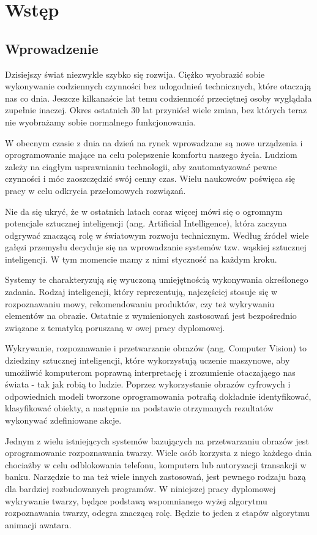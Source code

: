 \chapter{Wstęp}
\label{cha:wstep}

\section{Wprowadzenie}
Dzisiejszy świat niezwykle szybko się rozwija. Ciężko wyobrazić sobie wykonywanie codziennych czynności bez udogodnień technicznych, które otaczają nas co dnia. Jeszcze kilkanaście lat temu codzienność przeciętnej 
osoby wyglądała zupełnie inaczej. Okres ostatnich 30 lat przyniósł wiele zmian, bez których teraz nie wyobrażamy sobie normalnego funkcjonowania.

W obecnym czasie z dnia na dzień na rynek wprowadzane są nowe urządzenia i oprogramowanie mające na celu polepszenie komfortu naszego życia. Ludziom zależy na ciągłym usprawnianiu technologii, aby zautomatyzować pewne czynności i móc zaoszczędzić swój cenny czas. Wielu naukowców poświęca się pracy w celu odkrycia przełomowych rozwiązań.

Nie da się ukryć, że w ostatnich latach coraz więcej mówi się o ogromnym potencjale sztucznej inteligencji (ang. Artificial Intelligence), która zaczyna odgrywać znaczącą rolę w światowym rozwoju technicznym. Według źródeł wiele gałęzi przemysłu decyduje się na wprowadzanie systemów tzw. wąskiej sztucznej inteligencji. W tym momencie mamy z nimi styczność na każdym kroku.\cite{ai}   

Systemy te charakteryzują się wyuczoną umiejętnością wykonywania określonego zadania. Rodzaj inteligencji, który reprezentują, najczęściej stosuje się w rozpoznawaniu mowy, rekomendowaniu produktów, czy też wykrywaniu elementów na obrazie. Ostatnie z wymienionych zastosowań jest bezpośrednio związane z tematyką poruszaną w owej pracy dyplomowej.

Wykrywanie, rozpoznawanie i przetwarzanie obrazów (ang. Computer Vision) to dziedziny sztucznej inteligencji, które wykorzystują uczenie maszynowe, aby umożliwić komputerom poprawną interpretację i zrozumienie otaczająego nas świata - tak jak robią to ludzie. Poprzez wykorzystanie obrazów cyfrowych i odpowiednich modeli tworzone oprogramowania potrafią dokładnie identyfikować, klasyfikować obiekty, a następnie na podstawie otrzymanych rezultatów wykonywać zdefiniowane akcje. \cite{computervision}

Jednym z wielu istniejących systemów bazujących na przetwarzaniu obrazów jest oprogramowanie rozpoznawania twarzy. Wiele osób korzysta z niego każdego dnia chociażby w celu odblokowania telefonu, komputera lub autoryzacji transakcji w banku. Narzędzie to ma też wiele innych zastosowań, jest pewnego rodzaju bazą dla bardziej rozbudowanych programów. W niniejszej pracy dyplomowej wykrywanie twarzy, będące podstawą wspomnianego wyżej algorytmu rozpoznawania twarzy, odegra znaczącą rolę. Będzie to jeden z etapów algorytmu animacji awatara.

